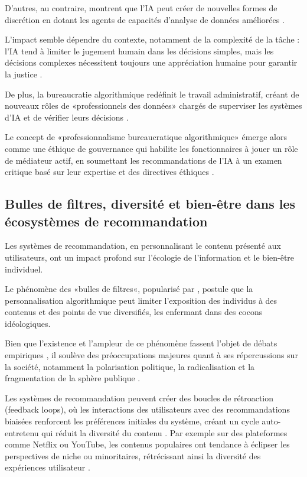 D'autres, au contraire, montrent que l'IA peut créer de nouvelles formes de discrétion en dotant les agents de capacités d'analyse de données améliorées \citet{Bullock2020}. 

L'impact semble dépendre du contexte, notamment de la complexité de la tâche : l'IA tend à limiter le jugement humain dans les décisions simples, mais les décisions complexes nécessitent toujours une appréciation humaine pour garantir la justice \citep{Bullock2019, Nagtegaal2021}.

De plus, la bureaucratie algorithmique redéfinit le travail administratif, créant de nouveaux rôles de «professionnels des données» chargés de superviser les systèmes d'IA et de vérifier leurs décisions \citep{Fest2023}.

Le concept de «professionnalisme bureaucratique algorithmique» émerge alors comme une éthique de gouvernance qui habilite les fonctionnaires à jouer un rôle de médiateur actif, en soumettant les recommandations de l'IA à un examen critique basé sur leur expertise et des directives éthiques \citet{Busuioc2020}.

\subsection{Bulles de filtres, diversité et bien-être dans les écosystèmes de recommandation}
Les systèmes de recommandation, en personnalisant le contenu présenté aux utilisateurs, ont un impact profond sur l'écologie de l'information et le bien-être individuel. 

Le phénomène des «bulles de filtres«, popularisé par \citet{Pariser2011}, postule que la personnalisation algorithmique peut limiter l'exposition des individus à des contenus et des points de vue diversifiés, les enfermant dans des cocons idéologiques.

Bien que l'existence et l'ampleur de ce phénomène fassent l'objet de débats empiriques \citet{ZuiderveenBorgesius2016}, il soulève des préoccupations majeures quant à ses répercussions sur la société, notamment la polarisation politique, la radicalisation et la fragmentation de la sphère publique \citet{Sunstein2018}.

Les systèmes de recommandation peuvent créer des boucles de rétroaction (feedback loops), où les interactions des utilisateurs avec des recommandations biaisées renforcent les préférences initiales du système, créant un cycle auto-entretenu qui réduit la diversité du contenu \citet{Chen2020}. Par exemple sur des plateformes comme Netflix ou YouTube, les contenus populaires ont tendance à éclipser les perspectives de niche ou minoritaires, rétrécissant ainsi la diversité des expériences utilisateur \citet{Chen2020}.

